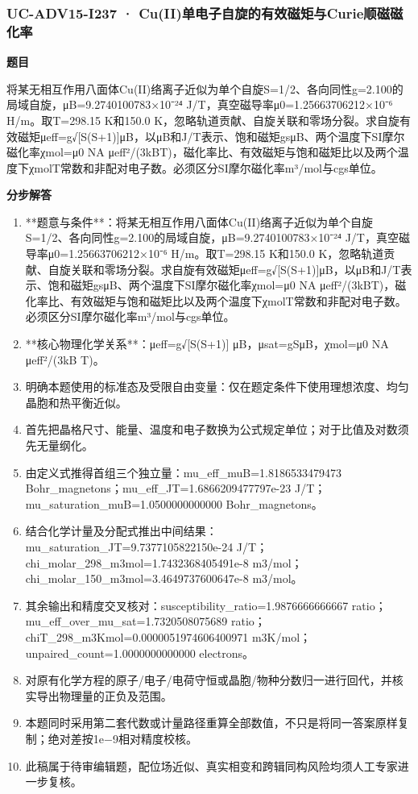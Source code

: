 \documentclass[UTF8,11pt,a4paper]{ctexart}
\begin{document}
\subsubsection*{UC-ADV15-I237 · Cu(II)单电子自旋的有效磁矩与Curie顺磁磁化率}
\noindent\textbf{题目}\par
将某无相互作用八面体Cu(II)络离子近似为单个自旋S=1/2、各向同性g=2.100的局域自旋，μB=9.2740100783×10⁻²⁴ J/T，真空磁导率μ0=1.25663706212×10⁻⁶ H/m。取T=298.15 K和150.0 K，忽略轨道贡献、自旋关联和零场分裂。求自旋有效磁矩μeff=g√[S(S+1)]μB，以μB和J/T表示、饱和磁矩gsμB、两个温度下SI摩尔磁化率χmol=μ0 NA μeff²/(3kBT)，磁化率比、有效磁矩与饱和磁矩比以及两个温度下χmolT常数和非配对电子数。必须区分SI摩尔磁化率m³/mol与cgs单位。\par
\medskip\noindent\textbf{分步解答}
\begin{enumerate}
\item **题意与条件**：将某无相互作用八面体Cu(II)络离子近似为单个自旋S=1/2、各向同性g=2.100的局域自旋，μB=9.2740100783×10⁻²⁴ J/T，真空磁导率μ0=1.25663706212×10⁻⁶ H/m。取T=298.15 K和150.0 K，忽略轨道贡献、自旋关联和零场分裂。求自旋有效磁矩μeff=g√[S(S+1)]μB，以μB和J/T表示、饱和磁矩gsμB、两个温度下SI摩尔磁化率χmol=μ0 NA μeff²/(3kBT)，磁化率比、有效磁矩与饱和磁矩比以及两个温度下χmolT常数和非配对电子数。必须区分SI摩尔磁化率m³/mol与cgs单位。
\item **核心物理化学关系**：μeff=g√[S(S+1)] μB，μsat=gSμB，χmol=μ0 NA μeff²/(3kB T)。
\item 明确本题使用的标准态及受限自由变量：仅在题定条件下使用理想浓度、均匀晶胞和热平衡近似。
\item 首先把晶格尺寸、能量、温度和电子数换为公式规定单位；对于比值及对数须先无量纲化。
\item 由定义式推得首组三个独立量：mu\_eff\_muB=1.8186533479473 Bohr\_magnetons；mu\_eff\_JT=1.6866209477797e-23 J/T；mu\_saturation\_muB=1.0500000000000 Bohr\_magnetons。
\item 结合化学计量及分配式推出中间结果：mu\_saturation\_JT=9.7377105822150e-24 J/T；chi\_molar\_298\_m3mol=1.7432368405491e-8 m3/mol；chi\_molar\_150\_m3mol=3.4649737600647e-8 m3/mol。
\item 其余输出和精度交叉核对：susceptibility\_ratio=1.9876666666667 ratio；mu\_eff\_over\_mu\_sat=1.7320508075689 ratio；chiT\_298\_m3Kmol=0.0000051974606400971 m3K/mol；unpaired\_count=1.0000000000000 electrons。
\item 对原有化学方程的原子/电子/电荷守恒或晶胞/物种分数归一进行回代，并核实导出物理量的正负及范围。
\item 本题同时采用第二套代数或计量路径重算全部数值，不只是将同一答案原样复制；绝对差按1e−9相对精度校核。
\item 此稿属于待审编辑题，配位场近似、真实相变和跨辑同构风险均须人工专家进一步复核。
\end{enumerate}
\end{document}
